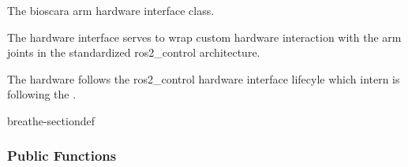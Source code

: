 \documentclass[letterpaper,10pt,english]{sphinxmanual}
\begin{document}
\begin{fulllineitems}
\label{\detokenize{code/bioscara_hardware_interfaces/index:_CPPv4N28bioscara_hardware_interfaces28bioscara_hardware_interfaces28BioscaraArmHardwareInterfaceE}}\label{\detokenize{code/bioscara_hardware_interfaces/index:_CPPv3N28bioscara_hardware_interfaces28bioscara_hardware_interfaces28BioscaraArmHardwareInterfaceE}}\label{\detokenize{code/bioscara_hardware_interfaces/index:_CPPv2N28bioscara_hardware_interfaces28bioscara_hardware_interfaces28BioscaraArmHardwareInterfaceE}}\label{\detokenize{code/bioscara_hardware_interfaces/index:bioscara_hardware_interfaces::bioscara_hardware_interfaces::BioscaraArmHardwareInterface}}
\pysigstartsignatures
\pysigstartmultiline
\pysigline
{\label{\detokenize{code/bioscara_hardware_interfaces/index:classbioscara__hardware__interfaces_1_1BioscaraArmHardwareInterface}}}
\pysigstopmultiline
\pysigstopsignatures{}
\sphinxAtStartPar
The bioscara arm hardware interface class. 

\sphinxAtStartPar
The hardware interface serves to wrap custom hardware interaction with the arm joints in the standardized ros2\_control architecture.

\sphinxAtStartPar
{} 
The hardware follows the ros2\_control hardware interface lifecyle which intern is following the .

\sphinxAtStartPar
{}

\begin{sphinxuseclass}{breathe-sectiondef}\subsubsection*{Public Functions}


\end{sphinxuseclass}
\end{fulllineitems}
\end{document}
